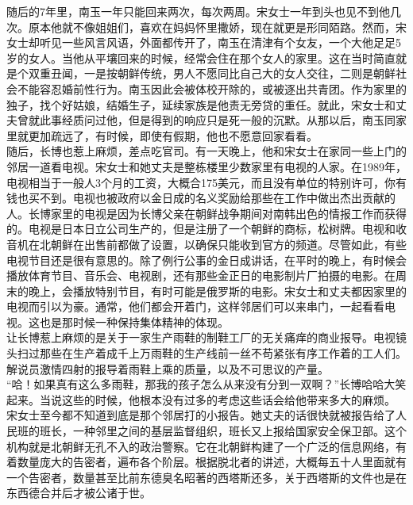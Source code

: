 随后的7年里，南玉一年只能回来两次，每次两周。宋女士一年到头也见不到他几次。原本他就不像姐姐们，喜欢在妈妈怀里撒娇，现在就更是形同陌路。然而，宋女士却听见一些风言风语，外面都传开了，南玉在清津有个女友，一个大他足足5岁的女人。当他从平壤回来的时候，经常会住在那个女人的家里。这在当时简直就是个双重丑闻，一是按朝鲜传统，男人不愿同比自己大的女人交往，二则是朝鲜社会不能容忍婚前性行为。南玉因此会被体校开除的，或被逐出共青团。作为家里的独子，找个好姑娘，结婚生子，延续家族是他责无旁贷的重任。就此，宋女士和丈夫曾就此事经质问过他，但是得到的响应只是死一般的沉默。从那以后，南玉同家里就更加疏远了，有时候，即使有假期，他也不愿意回家看看。\\

随后，长博也惹上麻烦，差点吃官司。有一天晚上，他和宋女士在家同一些上门的邻居一道看电视。宋女士和她丈夫是整栋楼里少数家里有电视的人家。在1989年，电视相当于一般人3个月的工资，大概合175美元，而且没有单位的特别许可，你有钱也买不到。电视也被政府以金日成的名义奖励给那些在工作中做出杰出贡献的人。长博家里的电视是因为长博父亲在朝鲜战争期间对南韩出色的情报工作而获得的。电视是日本日立公司生产的，但是注册了一个朝鲜的商标，松树牌。电视和收音机在北朝鲜在出售前都做了设置，以确保只能收到官方的频道。尽管如此，有些电视节目还是很有意思的。除了例行公事的金日成讲话，在平时的晚上，有时候会播放体育节目、音乐会、电视剧，还有那些金正日的电影制片厂拍摄的电影。在周末的晚上，会播放特别节目，有时可能是俄罗斯的电影。宋女士和丈夫都因家里的电视而引以为豪。通常，他们都会开着门，这样邻居们可以来串门，一起看看电视。这也是那时候一种保持集体精神的体现。\\

让长博惹上麻烦的是关于一家生产雨鞋的制鞋工厂的无关痛痒的商业报导。电视镜头扫过那些在生产着成千上万雨鞋的生产线前一丝不苟紧张有序工作着的工人们。解说员激情四射的报导着雨鞋上乘的质量，以及不可思议的产量。\\

“哈！如果真有这么多雨鞋，那我的孩子怎么从来没有分到一双啊？”长博哈哈大笑起来。当说这些的时候，他根本没有过多的考虑这些话会给他带来多大的麻烦。\\

宋女士至今都不知道到底是那个邻居打的小报告。她丈夫的话很快就被报告给了人民班的班长，一种邻里之间的基层监督组织，班长又上报给国家安全保卫部。这个机构就是北朝鲜无孔不入的政治警察。它在北朝鲜构建了一个广泛的信息网络，有着数量庞大的告密者，遍布各个阶层。根据脱北者的讲述，大概每五十人里面就有一个告密者，数量甚至比前东德臭名昭著的西塔斯还多，关于西塔斯的文件也是在东西德合并后才被公诸于世。\\

